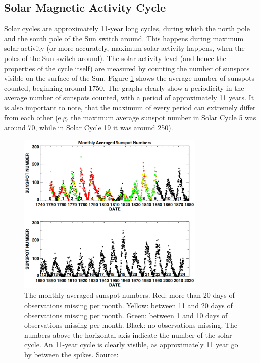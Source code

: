 \documentclass[11pt]{article}
\begin{document}
    \subsection{Solar Magnetic Activity Cycle}\label{sec:solarcycle}
        Solar cycles are approximately 11-year long cycles, during which the north pole and the south pole of the Sun switch around. This happens during maximum solar activity (or more accurately, maximum solar activity happens, when the poles of the Sun switch around). The solar activity level (and hence the properties of the cycle itself) are measured by counting the number of sunspots visible on the surface of the Sun. Figure \ref{fig:sunspots} shows the average number of sunspots counted, beginning around 1750. The graphs clearly show a periodicity in the average number of sunspots counted, with a period of approximately 11 years. It is also important to note, that the maximum of every period can extremely differ from each other (e.g. the maximum average sunspot number in Solar Cycle 5 was around 70, while in Solar Cycle 19 it was around 250).\\
        \begin{figure}[t!]
            \centering
            \includegraphics[width=0.8\textwidth]{fig_theory/sunspots.png}
            \caption{The monthly averaged sunspot numbers. Red: more than 20 days of observations missing per month. Yellow: between 11 and 20 days of observations missing per month. Green: between 1 and 10 days of observations missing per month. Black: no observations missing. The numbers above the horizontal axis indicate the number of the solar cycle. An 11-year cycle is clearly visible, as approximately 11 year go by between the spikes. Source: \cite{2015hathaway}}
            \label{fig:sunspots}
        \end{figure}\\
\end{document}

